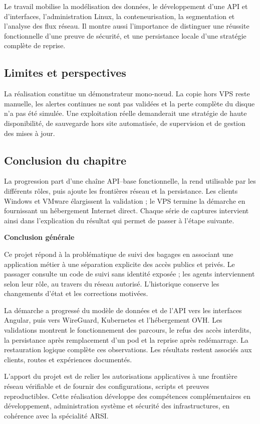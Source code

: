 \documentclass[11pt]{extarticle}
\newcommand{\fronttitle}[1]{\clearpage\phantomsection\begin{center}{\Huge\bfseries #1}\end{center}\vspace{\baselineskip}\addcontentsline{toc}{section}{#1}}
\begin{document}
Le travail mobilise la modélisation des données, le développement d'une API et d'interfaces, l'administration Linux, la conteneurisation, la segmentation et l'analyse des flux réseau. Il montre aussi l'importance de distinguer une réussite fonctionnelle d'une preuve de sécurité, et une persistance locale d'une stratégie complète de reprise.
\FloatBarrier
\subsection{Limites et perspectives}

La réalisation constitue un démonstrateur mono-nœud. La copie hors VPS reste manuelle, les alertes continues ne sont pas validées et la perte complète du disque n’a pas été simulée. Une exploitation réelle demanderait une stratégie de haute disponibilité, de sauvegarde hors site automatisée, de supervision et de gestion des mises à jour.

\FloatBarrier
\subsection{Conclusion du chapitre}

La progression part d’une chaîne API--base fonctionnelle, la rend utilisable par les différents rôles, puis ajoute les frontières réseau et la persistance. Les clients Windows et VMware élargissent la validation ; le VPS termine la démarche en fournissant un hébergement Internet direct. Chaque série de captures intervient ainsi dans l’explication du résultat qui permet de passer à l’étape suivante.
\FloatBarrier
\fronttitle{Conclusion générale}
Ce projet répond à la problématique de suivi des bagages en associant une application métier à une séparation explicite des accès publics et privés. Le passager consulte un code de suivi sans identité exposée ; les agents interviennent selon leur rôle, au travers du réseau autorisé. L'historique conserve les changements d'état et les corrections motivées.

La démarche a progressé du modèle de données et de l'API vers les interfaces Angular, puis vers WireGuard, Kubernetes et l'hébergement OVH. Les validations montrent le fonctionnement des parcours, le refus des accès interdits, la persistance après remplacement d'un pod et la reprise après redémarrage. La restauration logique complète ces observations. Les résultats restent associés aux clients, routes et expériences documentés.

L'apport du projet est de relier les autorisations applicatives à une frontière réseau vérifiable et de fournir des configurations, scripts et preuves reproductibles. Cette réalisation développe des compétences complémentaires en développement, administration système et sécurité des infrastructures, en cohérence avec la spécialité ARSI.
\end{document}
